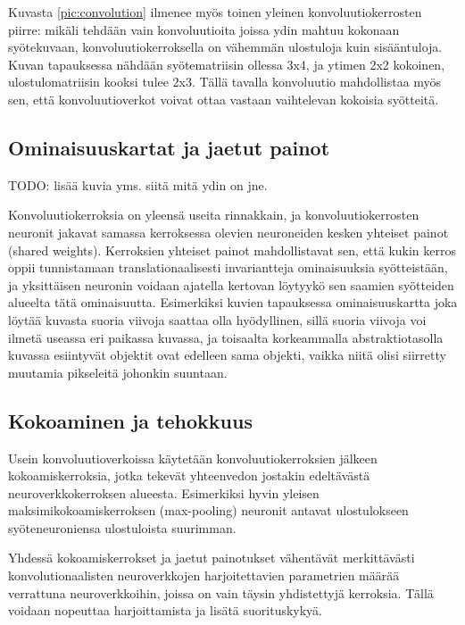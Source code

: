 \documentclass[finnish]{tktltiki2}
\theoremstyle{definition}
\theoremstyle{remark}
\begin{document}
    Kuvasta \ref{pic:convolution} ilmenee myös toinen yleinen konvoluutiokerrosten piirre: mikäli tehdään vain konvoluutioita joissa ydin mahtuu kokonaan syötekuvaan, konvoluutiokerroksella on vähemmän ulostuloja kuin sisääntuloja. Kuvan tapauksessa nähdään syötematriisin ollessa 3x4, ja ytimen 2x2 kokoinen, ulostulomatriisin kooksi tulee 2x3. Tällä tavalla konvoluutio mahdollistaa myös sen, että konvoluutioverkot voivat ottaa vastaan vaihtelevan kokoisia syötteitä.

    \subsection{Ominaisuuskartat ja jaetut painot}
  TODO: lisää kuvia yms. siitä mitä ydin on jne.

    Konvoluutiokerroksia on yleensä useita rinnakkain, ja konvoluutiokerrosten neuronit jakavat samassa kerroksessa olevien neuroneiden kesken yhteiset painot (shared weights). Kerroksien yhteiset painot mahdollistavat sen, että kukin kerros oppii tunnistamaan translationaalisesti invariantteja ominaisuuksia syötteistään, ja yksittäisen neuronin voidaan ajatella kertovan löytyykö sen saamien syötteiden alueelta tätä ominaisuutta. Esimerkiksi kuvien tapauksessa ominaisuuskartta joka löytää kuvasta suoria viivoja saattaa olla hyödyllinen, sillä suoria viivoja voi ilmetä useassa eri paikassa kuvassa, ja toisaalta korkeammalla abstraktiotasolla kuvassa esiintyvät objektit ovat edelleen sama objekti, vaikka niitä olisi siirretty muutamia pikseleitä johonkin suuntaan.

    \subsection{Kokoaminen ja tehokkuus}
    Usein konvoluutioverkoissa käytetään konvoluutiokerroksien jälkeen kokoamiskerroksia, jotka tekevät yhteenvedon jostakin edeltävästä neuroverkkokerroksen alueesta. 
    Esimerkiksi hyvin yleisen maksimikokoamiskerroksen (max-pooling) neuronit antavat ulostulokseen syöteneuroniensa ulostuloista suurimman.

    Yhdessä kokoamiskerrokset ja jaetut painotukset vähentävät merkittävästi konvolutionaalisten neuroverkkojen harjoitettavien parametrien määrää verrattuna neuroverkkoihin, joissa on vain täysin yhdistettyjä kerroksia. Tällä voidaan nopeuttaa harjoittamista ja lisätä suorituskykyä.
\end{document}
